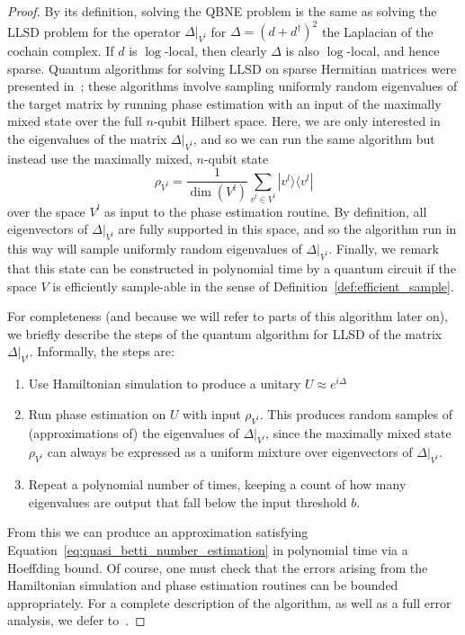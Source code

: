 \documentclass[11pt]{article}
\numberwithin{equation}{section}
\newcommand\equ[1] {\begin{equation}#1\end{equation}}
\renewcommand\( {\left(}
\renewcommand\) {\right)}
\begin{document}
\begin{proof}

By its definition, solving the {\sc QBNE} problem is the same as solving the {\sc LLSD} problem for the operator $\Delta|_{V^l}$ for $\Delta = (d+d^\dagger)^2$ the Laplacian of the cochain complex. If $d$ is $\log$-local, then clearly $\Delta$ is also $\log$-local, and hence sparse. Quantum algorithms for solving {\sc LLSD} on sparse Hermitian matrices were presented in~\cite{gyurik}; these algorithms involve sampling uniformly random eigenvalues of the target matrix by running phase estimation with an input of the maximally mixed state over the full $n$-qubit Hilbert space. Here, we are only interested in the eigenvalues of the matrix $\Delta|_{V^l}$, and so we can run the same algorithm but instead use the maximally mixed, $n$-qubit state
\equ{
	\rho_{V^l} = \frac{1}{\dim(V^l)} \sum_{v^l \in V^l} |v^l\rangle\langle v^l|
}
over the space $V^l$ as input to the phase estimation routine. By definition, all eigenvectors of $\Delta|_{V^l}$ are fully supported in this space, and so the algorithm run in this way will sample uniformly random eigenvalues of $\Delta|_{V^l}$. Finally, we remark that this state can be constructed in polynomial time by a quantum circuit if the space $V$ is efficiently sample-able in the sense of Definition~\ref{def:efficient_sample}. 

For completeness (and because we will refer to parts of this algorithm later on), we briefly describe the steps of the quantum algorithm for {\sc LLSD} of the matrix $\Delta|_{V^l}$. Informally, the steps are:
\begin{enumerate}
	\item Use Hamiltonian simulation to produce a unitary $U \approx e^{i\Delta}$
	\item Run phase estimation on $U$ with input $\rho_{V^l}$. This produces random samples of (approximations of) the eigenvalues of $\Delta|_{V^l}$, since the maximally mixed state $\rho_{V^l}$ can always be expressed as a uniform mixture over eigenvectors of $\Delta|_{V^l}$. 
	\item Repeat a polynomial number of times, keeping a count of how many eigenvalues are output that fall below the input threshold $b$. 
\end{enumerate}  

From this we can produce an approximation satisfying Equation~\ref{eq:quasi_betti_number_estimation} in polynomial time via a Hoeffding bound. Of course, one must check that the errors arising from the Hamiltonian simulation and phase estimation routines can be bounded appropriately. For a complete description of the algorithm, as well as a full error analysis, we defer to~\cite{gyurik}.
\end{proof}
\end{document}
